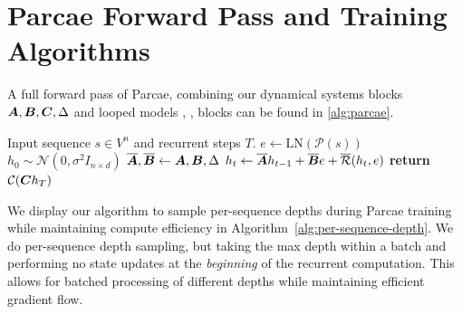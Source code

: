 \section{Parcae Forward Pass and Training Algorithms}
\label{sec:algorithm}


A full forward pass of Parcae, combining our dynamical systems blocks $\bm{A}, \bm{B}, \bm{C}, \Delta$ and looped models \prelude, \recurrent, \coda blocks can be found in \cref{alg:parcae}.


\begin{algorithm}[!ht]
\caption{Parcae Forward Pass}
\label{alg:parcae}
\begin{algorithmic}[1]
\Require Input sequence $s \in V^n$ and recurrent steps $T$.
\State $e \gets \text{LN}(\mathcal{P}(s))$ 
\State $h_0 \sim \mathcal{N}(0, \sigma^2 I_{n \times d})$ 
\State $\overline{\bm{A}}, \overline{\bm{B}} \gets \bm{A}, \bm{B}, \Delta$ 
    \State $h_t \gets \overline{\bm{A}} h_{t-1} + \overline{\bm{B}} e + \overline{\mathcal{R}}(h_t, e)$ 
\EndFor
\State \textbf{return} $\mathcal{C}(\bm{C} h_T)$
\end{algorithmic}
\end{algorithm}

We display our algorithm to sample per-sequence depths during Parcae training while maintaining compute efficiency in Algorithm~\ref{alg:per-sequence-depth}. We do per-sequence depth sampling, but taking the max depth within a batch and performing no state updates at the \emph{beginning} of the recurrent computation. This allows for batched processing of different depths while maintaining efficient gradient flow.

